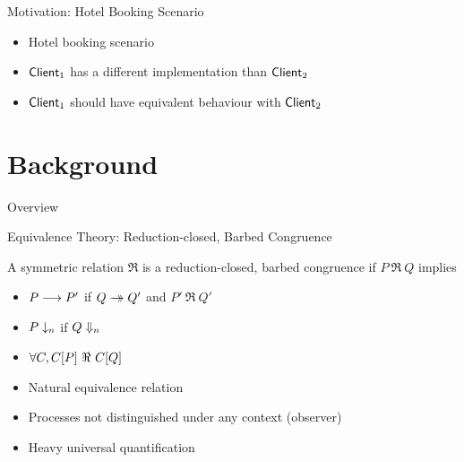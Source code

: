 \documentclass{beamer}
\newcommand{\currentsection}{
	\begin{frame}{Overview}
		\tableofcontents[currentsection]
	\end{frame}
}
\begin{document}
	\begin{frame}{Motivation: Hotel Booking Scenario}
		\begin{itemize}
			\item	Hotel booking scenario
				

			\item	$\mathsf{Client}_1$ has a different implementation than $\mathsf{Client}_2$
			\item	$\mathsf{Client}_1$ should have equivalent behaviour with $\mathsf{Client}_2$%
		\end{itemize}
	\end{frame}

	\section{Background}
	\currentsection

	\begin{frame}{Equivalence Theory: Reduction-closed, Barbed Congruence}
				\begin{definition}
				A symmetric relation $\Re$ is  a reduction-closed, barbed congruence
				if $P\ \Re\ Q$ implies
				\begin{itemize}
					\item	$P \longrightarrow P'$ if $Q \rightarrow\!\!\!\!\!\rightarrow Q'$ and $P'\ \Re\ Q'$
					\item	$P \downarrow_{n}$ if $Q \Downarrow_{n}$
					\item	$\forall C, \context{C}{P}\ \Re\ \context{C}{Q}$
				\end{itemize}
				\end{definition}

		\begin{itemize}
			\item	Natural equivalence relation
			\item	Processes not distinguished under any context (observer)
			\item	Heavy universal quantification
		\end{itemize}
	\end{frame}
\end{document}
